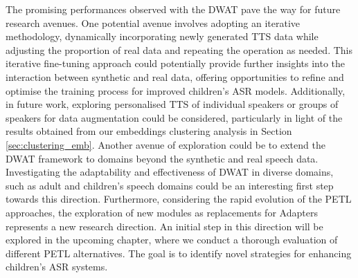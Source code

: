 The promising performances observed with the \ac{DWAT} pave the way for future research avenues. One potential avenue involves adopting an iterative methodology, dynamically incorporating newly generated \ac{TTS} data while adjusting the proportion of real data and repeating the operation as needed. This iterative fine-tuning approach could potentially provide further insights into the interaction between synthetic and real data, offering opportunities to refine and optimise the training process for improved children's \ac{ASR} models.
Additionally, in future work, exploring personalised \ac{TTS} of individual speakers or groups of speakers for data augmentation could be considered, particularly in light of the results obtained from our embeddings clustering analysis in Section \ref{sec:clustering_emb}.
Another avenue of exploration could be to extend the \ac{DWAT} framework to domains beyond the synthetic and real speech data. Investigating the adaptability and effectiveness of \ac{DWAT} in diverse domains, such as adult and children's speech domains could be an interesting first step towards this direction.
Furthermore, considering the rapid evolution of the \ac{PETL} approaches, the exploration of new modules as replacements for Adapters represents a new research direction. An initial step in this direction will be explored in the upcoming chapter, where we conduct a thorough evaluation of different \ac{PETL} alternatives. The goal is to identify novel strategies for enhancing children's \ac{ASR} systems.